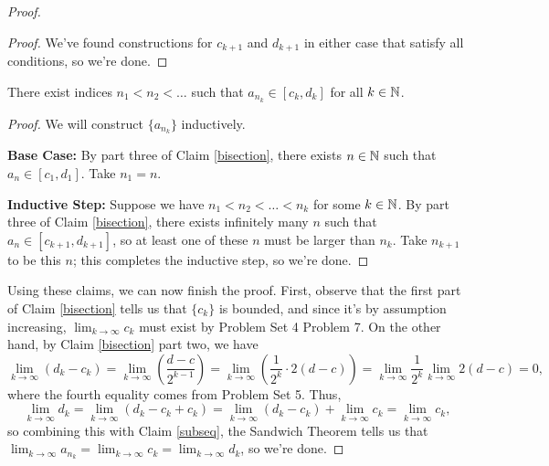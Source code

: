 \documentclass[main.tex]{subfiles}
\begin{document}
\begin{proof}
\begin{proof}
        We've found constructions for $c_{k + 1}$ and $d_{k + 1}$ in either case that satisfy all conditions, so we're done.
    \end{proof}
    
    \begin{claim}
    \label{subseq}
        There exist indices $n_1 < n_2 < \ldots$ such that $a_{n_k}\in [c_k, d_k]$ for all $k\in \mathbb N$.
    \end{claim}

    \begin{proof}
        We will construct $\{a_{n_k}\}$ inductively.
        
        \textbf{Base Case:} By part three of Claim \ref{bisection}, there exists $n\in \mathbb N$ such that $a_n\in [c_1, d_1]$. Take $n_1 = n$.

        \textbf{Inductive Step:} Suppose we have $n_1 < n_2 < \ldots < n_k$ for some $k\in \mathbb N$. By part three of Claim \ref{bisection}, there exists infinitely many $n$ such that $a_n\in [c_{k + 1}, d_{k + 1}]$, so at least one of these $n$ must be larger than $n_k$. Take $n_{k + 1}$ to be this $n$; this completes the inductive step, so we're done.
    \end{proof}

    Using these claims, we can now finish the proof. First, observe that the first part of Claim \ref{bisection} tells us that $\{c_k\}$ is bounded, and since it's by assumption increasing, $\lim_{k\to\infty} c_k$ must exist by Problem Set 4 Problem 7. On the other hand, by Claim \ref{bisection} part two, we have
    \[\lim_{k\to\infty}(d_k - c_k) = \lim_{k\to\infty} \left(\frac{d - c}{2^{k - 1}}\right) = \lim_{k\to\infty} \left(\frac{1}{2^k}\cdot 2(d - c)\right) = \lim_{k\to\infty} \frac{1}{2^k} \lim_{k\to\infty} 2(d - c) = 0,\]
    where the fourth equality comes from Problem Set 5. Thus,
    \[\lim_{k\to\infty} d_k = \lim_{k\to\infty} (d_k 
- c_k + c_k) = \lim_{k\to\infty} (d_k - c_k) + \lim_{k\to\infty} c_k = \lim_{k\to\infty} c_k,\]
    so combining this with Claim \ref{subseq}, the Sandwich Theorem tells us that $\lim_{k\to\infty} a_{n_k} = \lim_{k\to\infty} c_k = \lim_{k\to\infty} d_k$, so we're done.
\end{proof}
\end{document}
